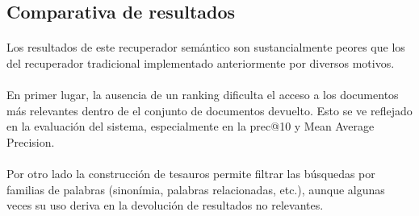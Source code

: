 \documentclass[a4paper]{article}
\begin{document}
\subsection{Comparativa de resultados}
\paragraph{}Los resultados de este recuperador semántico son sustancialmente peores que los del recuperador tradicional implementado anteriormente por diversos motivos. 
\paragraph{}En primer lugar, la ausencia de un ranking dificulta el acceso a los documentos más relevantes dentro de el conjunto de documentos devuelto. Esto se ve reflejado en la evaluación del sistema, especialmente en la prec@10 y Mean Average Precision. 
\paragraph{}Por otro lado la construcción de tesauros permite filtrar las búsquedas por familias de palabras (sinonímia, palabras relacionadas, etc.), aunque algunas veces su uso deriva en la devolución de resultados no relevantes.
\end{document}
